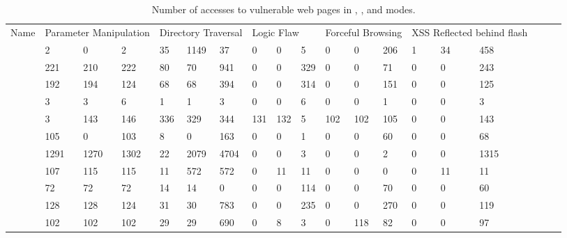 \begin{table*}[t]
{\begin{tabular}{|l|p{8ex}p{8ex}p{10ex}|p{4ex}p{4ex}p{5ex}|p{4ex}p{4ex}p{5ex}|p{4ex}p{4ex}p{5ex}|p{4ex}p{4ex}p{5ex}|p{4ex}p{4ex}p{5ex}|}
          \hline
          Name & \multicolumn{3}{|c|}{Parameter Manipulation} & \multicolumn{3}{|p{14ex}|}{Directory Traversal} & \multicolumn{3}{|p{14ex}|}{Logic Flaw} & \multicolumn{3}{|p{14ex}|}{Forceful Browsing} & \multicolumn{3}{|p{14ex}|}{XSS Reflected behind flash} & & & \\
          \acunetix{} & 2&0&2   & 35&1149&37   & 0&0&5   & 0&0&206   & 1&34&458 & & & \\
          \appscan{} & 221&210&222   & 80&70&941   & 0&0&329   & 0&0&71   & 0&0&243 & & & \\
          \burp{} & 192&194&124   & 68&68&394   & 0&0&314   & 0&0&151   & 0&0&125 & & & \\
          \grendelscan{} & 3&3&6   & 1&1&3   & 0&0&6   & 0&0&1   & 0&0&3 & & & \\
          \hailstorm{} & 3&143&146   & 336&329&344   & 131&132&5   & 102&102&105   & 0&0&143 & & & \\
          \milescan{} & 105&0&103   & 8&0&163   & 0&0&1   & 0&0&60   & 0&0&68   & & & \\
          \nstalker{} & 1291&1270&1302   & 22&2079&4704   & 0&0&3   & 0&0&2   & 0&0&1315 & & & \\
          \ntospider{} & 107&115&115   & 11&572&572   & 0&11&11   & 0&0&0   & 0&11&11 & & & \\
          \paros{} & 72&72&72   & 14&14&0   & 0&0&114   & 0&0&70   & 0&0&60 & & & \\
          \waf{} & 128&128&124   & 31&30&783   & 0&0&235   & 0&0&270   & 0&0&119 & & & \\
          \webinspect{} & 102&102&102   & 29&29&690   & 0&8&3   & 0&118&82   & 0&0&97 & & & \\
          \hline
        \end{tabular}}
        \caption{Number of accesses to vulnerable web pages in \initial{}, \config{}, and \manual{} modes.}
        \label{access}
  \end{table*}



